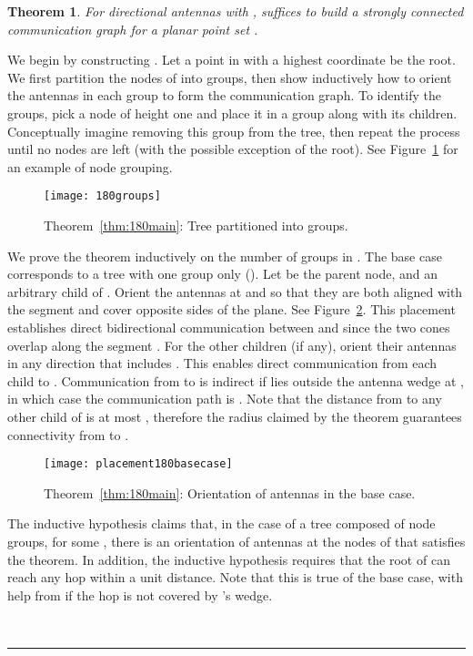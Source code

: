\documentclass[11pt]{article}
\newtheorem{theorem}{Theorem}
\newcommand{\qed}{\rule{0.5em}{1.5ex}}
\newcommand{\fqed}{{\hfill~\qed}}
\newenvironment{proof}{{\noindent \bf Proof.}}
                      {{\hfill \fqed} \vspace{1em}}
\begin{document}
\begin{theorem}
For directional antennas with , 
suffices to build a strongly connected communication graph for a planar
point set .
\end{theorem}
\begin{proof}
We begin by constructing .  Let a point in  with a highest
 coordinate be the root.
We first partition the nodes of  into groups, then show inductively how to
orient the antennas in each group to form the communication graph.
To identify the groups, pick a node of height one and place it in a group
along with its children.  Conceptually imagine removing this group from the
tree, then repeat the process until no nodes are left (with the
possible exception of the root).  See Figure~\ref{fig:groups} for an
example of node grouping.
\begin{figure}[htpb]
\centering
\texttt{[image: 180groups]}
\caption{Theorem~\ref{thm:180main}: Tree partitioned into groups.}
\label{fig:groups}
\end{figure}

We prove the theorem inductively on the number of groups  in .
The base case corresponds to a tree with one group only (). Let  be
the parent node, and  an arbitrary child of .
Orient the antennas at  and  so that they are both aligned
with the segment  and cover opposite sides of the plane.
See Figure~\ref{fig:placement180basecase}.
This placement establishes direct bidirectional
communication between  and  since the two cones overlap along
the segment .
For the other children (if any), orient their antennas in any direction
that includes . This enables direct communication from each child
 to .
Communication from  to  is indirect if  lies outside the
antenna wedge at , in which case the communication path is
. Note that the distance from  to any other child
of  is at most , therefore the radius  claimed by the
theorem guarantees connectivity from  to .

\begin{figure}[hptb]
\centering
\texttt{[image: placement180basecase]}
\caption{Theorem~\ref{thm:180main}: Orientation of antennas in the base case.}
\label{fig:placement180basecase}
\end{figure}

The inductive hypothesis claims that, in the case of a tree
 composed of  node groups, for some , there is an
orientation of antennas at the nodes of  that satisfies the theorem.
In addition, the inductive hypothesis requires that the root of 
can reach any hop within a unit distance.
Note that this is true of the base case, with help from 
if the hop is not covered by 's wedge.


\end{proof}
\end{document}
